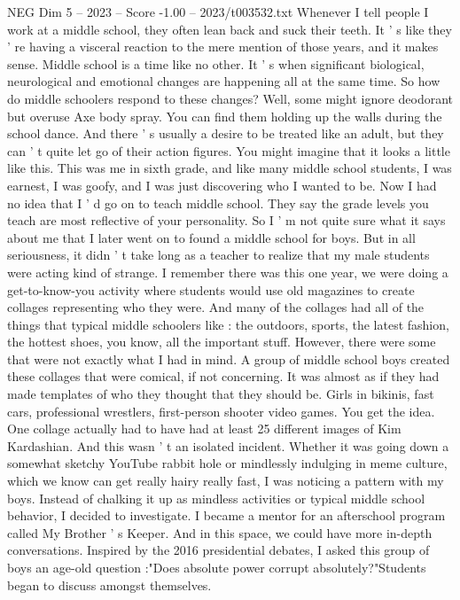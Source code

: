 \begin{textsample}{NEG Dim 5 – 2023 – Score -1.00 – 2023/t003532.txt}  \label{ex:f5_neg_010}
Whenever I tell people I work at a middle school, they often lean back and suck their teeth.
It ' s like they ' re having a visceral reaction to the mere mention of those years, and it makes sense.
Middle school is a time like no other.
It ' s when significant biological, neurological and emotional changes are happening all at the same time.
So how do middle schoolers respond to these changes?
Well, some might ignore deodorant but overuse Axe body spray.
You can find them holding up the walls during the school dance.
And there ' s usually a desire to be treated like an adult, but they can ' t quite let go of their action figures.
You might imagine that it looks a little like this.
This was me in sixth grade, and like many middle school students, I was earnest, I was goofy, and I was just discovering who I wanted to be.
Now I had no idea that I ' d go on to teach middle school.
They say the grade levels you teach are most reflective of your personality.
So I ' m not quite sure what it says about me that I later went on to found a middle school for boys.
But in all seriousness, it didn ' t take long as a teacher to realize that my male students were acting kind of strange.
I remember there was this one year, we were doing a get-to-know-you activity where students would use old magazines to create collages representing who they were.
And many of the collages had all of the things that typical middle schoolers like : the outdoors, sports, the latest fashion, the hottest shoes, you know, all the important stuff.
However, there were some that were not exactly what I had in mind.
A group of middle school boys created these collages that were comical, if not concerning.
It was almost as if they had made templates of who they thought that they should be.
Girls in bikinis, fast cars, professional wrestlers, first-person shooter video games.
You get the idea.
One collage actually had to have had at least 25 different images of Kim Kardashian.
And this wasn ' t an isolated incident.
Whether it was going down a somewhat sketchy YouTube rabbit hole or mindlessly indulging in meme culture, which we know can get really hairy really fast, I was noticing a pattern with my boys.
Instead of chalking it up as mindless activities or typical middle school behavior, I decided to investigate.
I became a mentor for an afterschool program called My Brother ' s Keeper.
And in this space, we could have more in-depth conversations.
Inspired by the 2016 presidential debates, I asked this group of boys an age-old question :"Does absolute power corrupt absolutely?"Students began to discuss amongst themselves.

\end{textsample}
